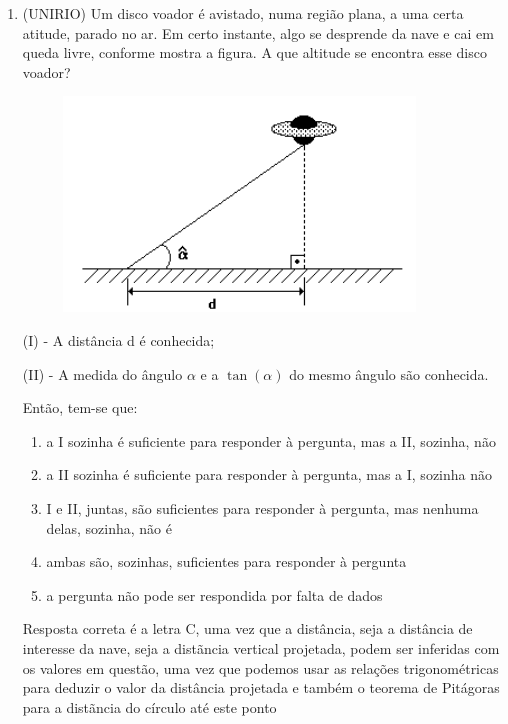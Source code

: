 \begin{multicols*}{2}
\begin{enumerate}[wide, labelwidth=!, labelindent=0pt]
        \item (UNIRIO) Um disco voador é avistado, numa região plana, a uma certa atitude, parado no ar. Em certo instante, algo se desprende da nave e cai em queda livre, conforme mostra a figura. A que altitude se encontra esse disco voador?
              \begin{figure}[H]
                  \centering
                  \includegraphics[scale=0.45]{assets/rafael/img40.png}
              \end{figure}
              (I) - A distância d é conhecida;

              (II) - A medida do ângulo $\alpha$ e a $\tan(\alpha)$ do mesmo ângulo são conhecida.

              Então, tem-se que:
              \begin{enumerate}
                  \item a I sozinha é suficiente para responder à pergunta, mas a II, sozinha, não
                  \item a II sozinha é suficiente para responder à pergunta, mas a I, sozinha não
                  \item I e II, juntas, são suficientes para responder à pergunta, mas nenhuma delas, sozinha, não é
                  \item ambas são, sozinhas, suficientes para responder à pergunta
                  \item a pergunta não pode ser respondida por falta de dados
              \end{enumerate}
              Resposta correta é a letra C, uma vez que a distância, seja a distância de interesse da nave, seja a distãncia vertical projetada, podem ser inferidas com os valores em questão, uma vez que podemos usar as relações trigonométricas para deduzir o valor da distância projetada e também o teorema de Pitágoras para a distãncia do círculo até este ponto
    \end{enumerate}


    

    

\end{multicols*}